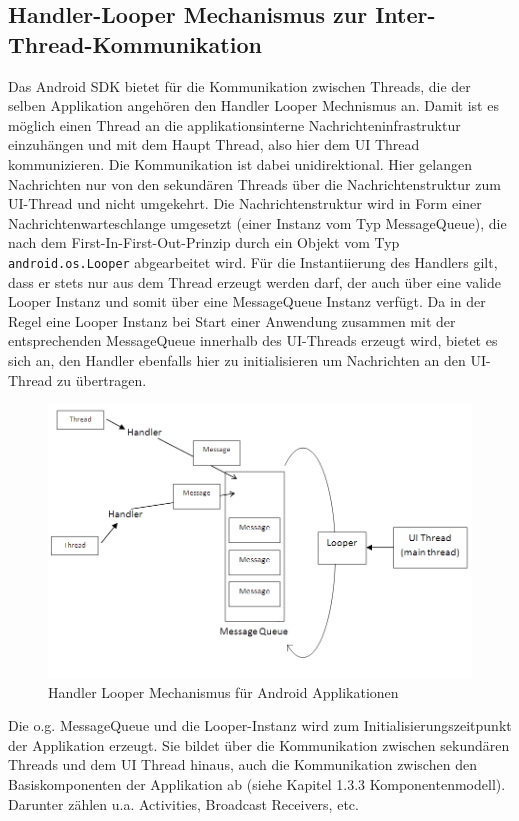 \documentclass[12pt,oneside,a4paper,bibtotoc,liststotoc]{scrreprt}
\begin{document}
\subsection{Handler-Looper Mechanismus zur Inter-Thread-Kommunikation}
Das Android SDK bietet für die Kommunikation zwischen Threads, die der selben Applikation angehören den Handler Looper Mechnismus an. Damit ist es möglich einen Thread an die applikationsinterne Nachrichteninfrastruktur einzuhängen und mit dem Haupt Thread, also hier dem UI Thread kommunizieren. Die Kommunikation ist dabei unidirektional. Hier gelangen Nachrichten nur von den sekundären Threads über die Nachrichtenstruktur zum UI-Thread und nicht umgekehrt. Die Nachrichtenstruktur wird in Form einer Nachrichtenwarteschlange umgesetzt (einer Instanz vom Typ MessageQueue), die nach dem First-In-First-Out-Prinzip durch ein Objekt vom Typ \texttt{android.os.Looper} abgearbeitet wird. Für die Instantiierung des Handlers gilt, dass er stets nur aus dem Thread erzeugt werden darf, der auch über eine valide Looper Instanz und somit über eine MessageQueue Instanz verfügt. Da in der Regel eine Looper Instanz bei Start einer Anwendung zusammen mit der entsprechenden MessageQueue innerhalb des UI-Threads erzeugt wird, bietet es sich an, den Handler ebenfalls hier zu initialisieren um Nachrichten an den UI-Thread zu übertragen.
\begin{figure}[H]
  \begin{centering}
    \includegraphics[width=1\textwidth]{img/handler_looper.png}
    \caption{Handler Looper Mechanismus für Android Applikationen \cite[]{handlerLooperBlock}}
    \label{handler_looper}
  \end{centering}
\end{figure}
Die o.g. MessageQueue und die Looper-Instanz wird zum Initialisierungszeitpunkt der Applikation erzeugt. Sie bildet über die Kommunikation zwischen sekundären Threads und dem UI Thread hinaus, auch die Kommunikation zwischen den Basiskomponenten der Applikation ab (siehe Kapitel 1.3.3 Komponentenmodell). Darunter zählen u.a. Activities, Broadcast Receivers, etc.
\end{document}
